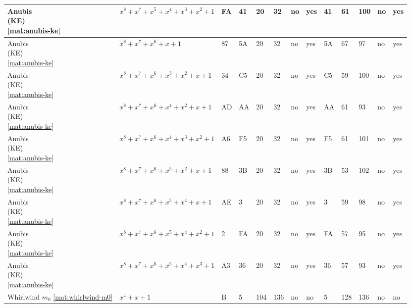 \begin{tiny}
\begin{longtable}{|l|l|l|l|l|l|l|l|l|l|l|l|l|}
\shortstack{Anubis \\ (KE) \\ \eqref{mat:anubis-ke}} & $x^8 + x^7 + x^5 + x^4 + x^3 + x^2 + 1$ & FA & 41 & 20 & 32 & no & yes & 41 & 61 & 100 & no & yes \\ \hline
\shortstack{Anubis \\ (KE) \\ \eqref{mat:anubis-ke}} & $x^8 + x^7 + x^6 + x + 1$ & 87 & 5A & 20 & 32 & no & yes & 5A & 67 & 97 & no & yes \\ \hline
\shortstack{Anubis \\ (KE) \\ \eqref{mat:anubis-ke}} & $x^8 + x^7 + x^6 + x^3 + x^2 + x + 1$ & 34 & C5 & 20 & 32 & no & yes & C5 & 59 & 100 & no & yes \\ \hline
\shortstack{Anubis \\ (KE) \\ \eqref{mat:anubis-ke}} & $x^8 + x^7 + x^6 + x^4 + x^2 + x + 1$ & AD & AA & 20 & 32 & no & yes & AA & 61 & 93 & no & yes \\ \hline
\shortstack{Anubis \\ (KE) \\ \eqref{mat:anubis-ke}} & $x^8 + x^7 + x^6 + x^4 + x^3 + x^2 + 1$ & A6 & F5 & 20 & 32 & no & yes & F5 & 61 & 101 & no & yes \\ \hline
\shortstack{Anubis \\ (KE) \\ \eqref{mat:anubis-ke}} & $x^8 + x^7 + x^6 + x^5 + x^2 + x + 1$ & 88 & 3B & 20 & 32 & no & yes & 3B & 53 & 102 & no & yes \\ \hline
\shortstack{Anubis \\ (KE) \\ \eqref{mat:anubis-ke}} & $x^8 + x^7 + x^6 + x^5 + x^4 + x + 1$ & AE & 3 & 20 & 32 & no & yes & 3 & 59 & 98 & no & yes \\ \hline
\shortstack{Anubis \\ (KE) \\ \eqref{mat:anubis-ke}} & $x^8 + x^7 + x^6 + x^5 + x^4 + x^2 + 1$ & 2 & FA & 20 & 32 & no & yes & FA & 57 & 95 & no & yes \\ \hline
\shortstack{Anubis \\ (KE) \\ \eqref{mat:anubis-ke}} & $x^8 + x^7 + x^6 + x^5 + x^4 + x^3 + 1$ & A3 & 36 & 20 & 32 & no & yes & 36 & 57 & 93 & no & yes \\ \hline
\shortstack{Whirlwind \\ $m_0$ \\ \eqref{mat:whirlwind-m0}} & $x^4 + x + 1$ & B & 5 & 104 & 136 & no & no & 5 & 128 & 136 & no & no \\ \hline

\end{longtable}
\end{tiny}
